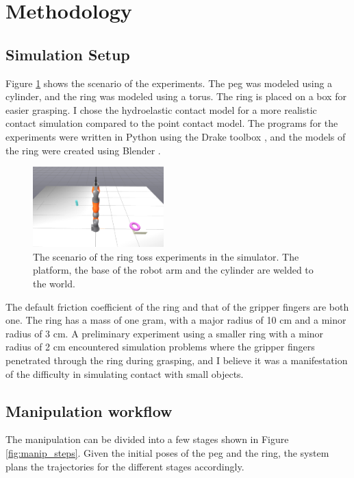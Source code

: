 \documentclass[conference]{IEEEtran}
\begin{document}
\section{Methodology}

\subsection{Simulation Setup}
Figure \ref{fig:scenario} shows the scenario of the experiments. The peg was modeled using a cylinder, and the ring was modeled using a torus. The ring is placed on a box for easier grasping. I chose the hydroelastic contact model for a more realistic contact simulation compared to the point contact model. The programs for the experiments were written in Python using the Drake toolbox \cite{drake}, and the models of the ring were created using Blender \cite{blender}.

\begin{figure}[ht]
\centering
\includegraphics[width=0.45\textwidth]{images/scenario.png}
\caption{The scenario of the ring toss experiments in the simulator. The platform, the base of the robot arm and the cylinder are welded to the world.}
\label{fig:scenario}
\end{figure}

The default friction coefficient of the ring and that of the gripper fingers are both one. The ring has a mass of one gram, with a major radius of 10 cm and a minor radius of 3 cm. A preliminary experiment using a smaller ring with a minor radius of 2 cm encountered simulation problems where the gripper fingers penetrated through the ring during grasping, and I believe it was a manifestation of the difficulty in simulating contact with small objects.

\subsection{Manipulation workflow}

The manipulation can be divided into a few stages shown in Figure \ref{fig:manip_steps}. Given the initial poses of the peg and the ring, the system plans the trajectories for the different stages accordingly.
\end{document}
